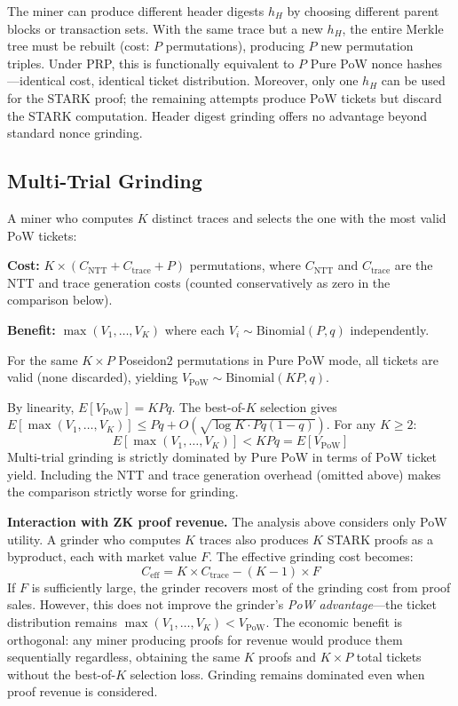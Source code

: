 \documentclass[11pt,a4paper]{article}
\begin{document}
The miner can produce different header digests $h_H$ by choosing different parent blocks or transaction sets. With the same trace but a new $h_H$, the entire Merkle tree must be rebuilt (cost: $P$ permutations), producing $P$ new permutation triples. Under PRP, this is functionally equivalent to $P$ Pure PoW nonce hashes---identical cost, identical ticket distribution. Moreover, only one $h_H$ can be used for the STARK proof; the remaining attempts produce PoW tickets but discard the STARK computation. Header digest grinding offers no advantage beyond standard nonce grinding.

\subsection{Multi-Trial Grinding}

A miner who computes $K$ distinct traces and selects the one with the most valid PoW tickets:

\textbf{Cost:} $K \times (C_{\mathrm{NTT}} + C_{\mathrm{trace}} + P)$ permutations, where $C_{\mathrm{NTT}}$ and $C_{\mathrm{trace}}$ are the NTT and trace generation costs (counted conservatively as zero in the comparison below).

\textbf{Benefit:} $\max(V_1, \ldots, V_K)$ where each $V_i \sim \mathrm{Binomial}(P, q)$ independently.

For the same $K \times P$ Poseidon2 permutations in Pure PoW mode, all tickets are valid (none discarded), yielding $V_{\mathrm{PoW}} \sim \mathrm{Binomial}(KP, q)$.

By linearity, $E[V_{\mathrm{PoW}}] = KPq$. The best-of-$K$ selection gives $E[\max(V_1, \ldots, V_K)] \leq Pq + O(\sqrt{\log K \cdot Pq(1-q)})$. For any $K \geq 2$:
\[
  E[\max(V_1, \ldots, V_K)] < KPq = E[V_{\mathrm{PoW}}]
\]
Multi-trial grinding is strictly dominated by Pure PoW in terms of PoW ticket yield. Including the NTT and trace generation overhead (omitted above) makes the comparison strictly worse for grinding.

\textbf{Interaction with ZK proof revenue.} The analysis above considers only PoW utility. A grinder who computes $K$ traces also produces $K$ STARK proofs as a byproduct, each with market value $F$. The effective grinding cost becomes:
\[
  C_{\mathrm{eff}} = K \times C_{\mathrm{trace}} - (K-1) \times F
\]
If $F$ is sufficiently large, the grinder recovers most of the grinding cost from proof sales. However, this does not improve the grinder's \emph{PoW advantage}---the ticket distribution remains $\max(V_1, \ldots, V_K) < V_{\mathrm{PoW}}$. The economic benefit is orthogonal: any miner producing proofs for revenue would produce them sequentially regardless, obtaining the same $K$ proofs and $K \times P$ total tickets without the best-of-$K$ selection loss. Grinding remains dominated even when proof revenue is considered.
\end{document}
